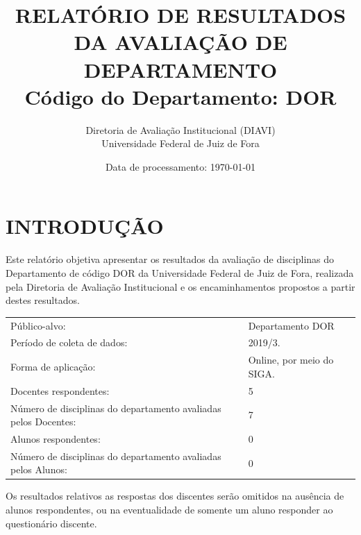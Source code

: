 \documentclass[a4paper,10pt]{article}
\date{Data de processamento: \today}
\begin{document}
\author{Diretoria de Avaliação Institucional (DIAVI) \\ Universidade Federal de Juiz de Fora}

\title{RELATÓRIO DE RESULTADOS DA AVALIAÇÃO DE DEPARTAMENTO\\ Código do Departamento: DOR}
\maketitle
\section{INTRODUÇÃO}
Este relatório objetiva apresentar os resultados da avaliação de disciplinas do Departamento     de código DOR da Universidade Federal de Juiz de Fora, realizada pela     Diretoria de Avaliação Institucional e os encaminhamentos propostos a     partir destes resultados.

\begin{center}
\begin{tabularx}{\linewidth}{X|l}

Público-alvo:& Departamento  DOR\\

Período de coleta de dados:& 2019/3.\\

Forma de aplicação:& Online, por meio do SIGA.\\

Docentes respondentes:& 5\\

Número de disciplinas do departamento avaliadas pelos Docentes:& 7\\

Alunos   respondentes:& 0\\

Número de disciplinas do departamento  avaliadas pelos   Alunos:& 0\\
\end{tabularx}
\end{center}

Os resultados relativos as respostas dos discentes serão omitidos na ausência de alunos respondentes, ou na eventualidade de somente um aluno responder ao questionário discente.
\end{document}
